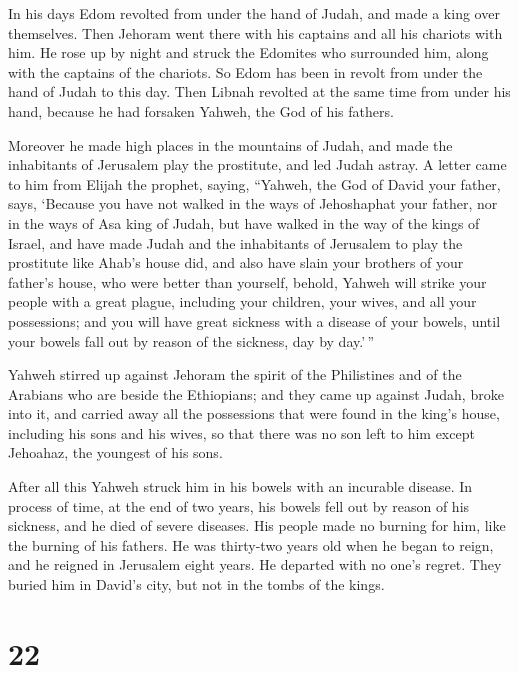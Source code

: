  In his days Edom revolted from under the hand of Judah, and
made a king over themselves.  Then Jehoram went there with
his captains and all his chariots with him. He rose up by night and
struck the Edomites who surrounded him, along with the captains of the
chariots.  So Edom has been in revolt from under the hand
of Judah to this day. Then Libnah revolted at the same time from under
his hand, because he had forsaken Yahweh, the God of his fathers.

 Moreover he made high places in the mountains of Judah,
and made the inhabitants of Jerusalem play the prostitute, and led Judah
astray.  A letter came to him from Elijah the prophet,
saying, ``Yahweh, the God of David your father, says, `Because you have
not walked in the ways of Jehoshaphat your father, nor in the ways of
Asa king of Judah,  but have walked in the way of the kings
of Israel, and have made Judah and the inhabitants of Jerusalem to play
the prostitute like Ahab's house did, and also have slain your brothers
of your father's house, who were better than yourself, 
behold, Yahweh will strike your people with a great plague, including
your children, your wives, and all your possessions;  and
you will have great sickness with a disease of your bowels, until your
bowels fall out by reason of the sickness, day by day.'\,''

 Yahweh stirred up against Jehoram the spirit of the
Philistines and of the Arabians who are beside the Ethiopians;
 and they came up against Judah, broke into it, and carried
away all the possessions that were found in the king's house, including
his sons and his wives, so that there was no son left to him except
Jehoahaz, the youngest of his sons.

 After all this Yahweh struck him in his bowels with an
incurable disease.  In process of time, at the end of two
years, his bowels fell out by reason of his sickness, and he died of
severe diseases. His people made no burning for him, like the burning of
his fathers.  He was thirty-two years old when he began to
reign, and he reigned in Jerusalem eight years. He departed with no
one's regret. They buried him in David's city, but not in the tombs of
the kings.

\hypertarget{section-21}{%
\section{22}\label{section-21}}

